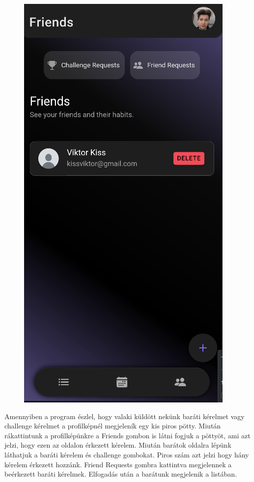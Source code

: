 \documentclass[12pt]{report}
\begin{document}
\begin{figure}[H]
\begin{minipage}[t]{0.25\textwidth}
        \centering
        \includegraphics[width=\linewidth]{src/friendrequest5.png}
    \end{minipage}

\end{figure}
  Amennyiben a program észlel, hogy valaki küldött nekünk baráti kérelmet vagy challenge kérelmet a profilképnél megjeleník egy kis piros pötty. Miután rákattintunk a profilképünkre a Friends gombon is látni fogjuk a pöttyöt, ami azt jelzi, hogy ezen az oldalon érkezett kérelem. Miután barátok oldalra lépünk láthatjuk a baráti kérelem és challenge gombokat. Piros szám azt jelzi hogy hány kérelem érkezett hozzánk. Friend Requests gombra kattintva megjelennek a beérkezett baráti kérelmek. Elfogadás után a barátunk megjelenik a listában.
\end{document}
